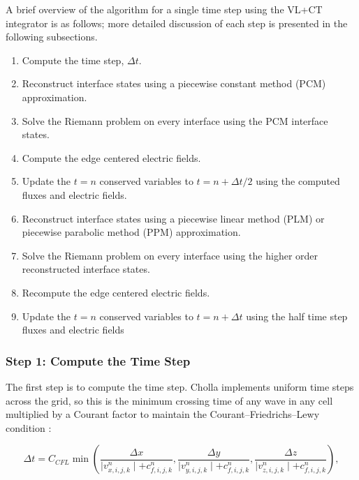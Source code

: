 \documentclass[modern, linenumbers]{aastex631}
\begin{document}
A brief overview of the algorithm for a single time step using the VL+CT integrator is as follows; more detailed discussion of each step is presented in the following subsections.

\begin{enumerate}
    \item Compute the time step, $\Delta t$.
    \item Reconstruct interface states using a piecewise constant method (PCM) approximation.
    \item Solve the Riemann problem on every interface using the PCM interface states.
    \item Compute the edge centered electric fields.
    \item Update the $t=n$ conserved variables to $t=n+\Delta t/2$ using the computed fluxes and electric fields.
    \item Reconstruct interface states using a piecewise linear method (PLM) or piecewise parabolic method (PPM) approximation.
    \item Solve the Riemann problem on every interface using the higher order reconstructed interface states.
    \item Recompute the edge centered electric fields.
    \item Update the $t=n$ conserved variables to $t=n+\Delta t$ using the half time step fluxes and electric fields
\end{enumerate}


\subsubsection{Step 1: Compute the Time Step}
\label{vlct:dt}

The first step is to compute the time step. Cholla implements uniform time steps across the grid, so this is the minimum crossing time of any wave in any cell multiplied by a Courant factor to maintain the Courant–Friedrichs–Lewy condition \cite{cfl}:

\begin{equation}
        \label{eqn:dt}
        \Delta t = C_{CFL} \min \left(
            \frac{\Delta x}{\mid v^n_{x,i,j,k} \mid + c^n_{f,i,j,k}},
            \frac{\Delta y}{\mid v^n_{y,i,j,k} \mid + c^n_{f,i,j,k}},
            \frac{\Delta z}{\mid v^n_{z,i,j,k} \mid + c^n_{f,i,j,k}}
        \right),
\end{equation}
\end{document}
